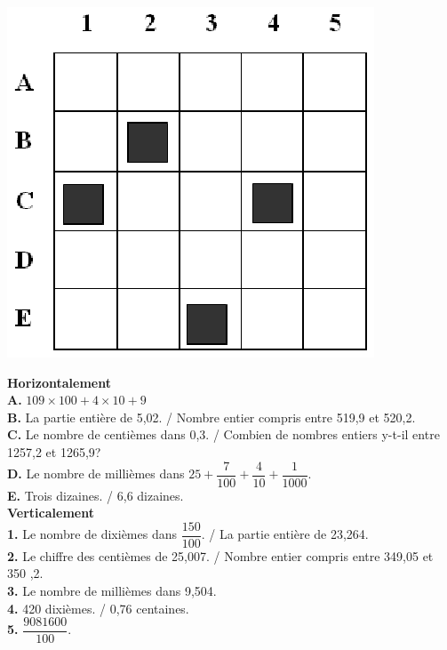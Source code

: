 \documentclass[a4paper,11pt]{article}
\begin{document}
\begin{center}
\includegraphics[scale=1]{motcroise.eps} 
\end{center}

\textbf{Horizontalement}\\

\noindent \textbf{A.}      $109 \times 100 + 4 \times 10 + 9$\\
\textbf{B.}        La partie entière de 5,02. /  Nombre entier compris entre 
519,9 et  520,2.\\
\textbf{C.}      Le nombre de centièmes dans 0,3. / Combien de nombres entiers y-t-il entre 1257,2 et 1265,9?\\
\textbf{D.}       Le nombre de millièmes dans $25 + \dfrac{7}{100} + \dfrac{4}{10} + \dfrac{1}{1000}$.\\
\textbf{E.}      Trois dizaines. /   6,6 dizaines.\\

\textbf{Verticalement}\\

\noindent \textbf{1.}      Le nombre de dixièmes dans $\dfrac{150}{100}$. / La partie entière de 23,264.\\
\textbf{2.}      Le chiffre des centièmes de 25,007. / Nombre entier compris 
entre 349,05 et 350 ,2.\\
\textbf{3.}      Le nombre de millièmes dans 9,504.\\
\textbf{4.}      420 dixièmes. /  0,76 centaines.\\
\textbf{5.}      $\dfrac{9081600}{100}$.\\
\end{document}
